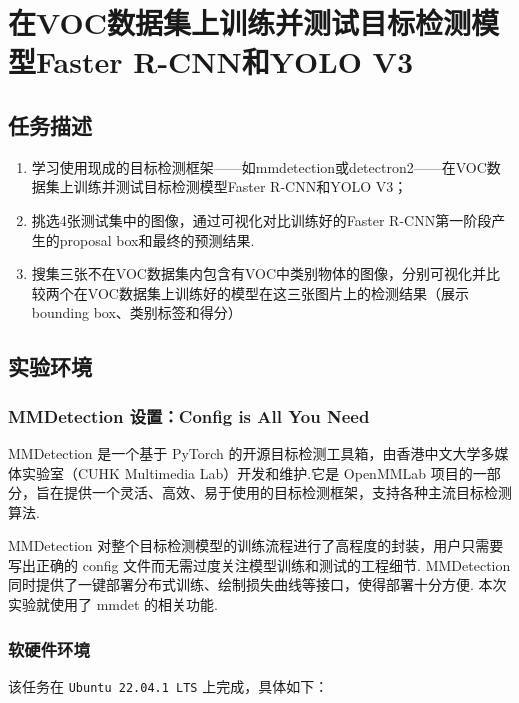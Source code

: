 \documentclass[notitlepage,cs4size,punct,oneside]{ctexrep}
\numberwithin{equation}{chapter}
\theoremstyle{mystyle}
\begin{document}
\chapter{在VOC数据集上训练并测试目标检测模型Faster R-CNN和YOLO V3}
\section{任务描述}
\begin{enumerate}
    \item 学习使用现成的目标检测框架——如mmdetection或detectron2——在VOC数据集上训练并测试目标检测模型Faster R-CNN和YOLO V3；
    \item 挑选4张测试集中的图像，通过可视化对比训练好的Faster R-CNN第一阶段产生的proposal box和最终的预测结果.
    \item 搜集三张不在VOC数据集内包含有VOC中类别物体的图像，分别可视化并比较两个在VOC数据集上训练好的模型在这三张图片上的检测结果（展示bounding box、类别标签和得分）
\end{enumerate}


\section{实验环境}
\subsection{MMDetection 设置：Config is All You Need}
MMDetection 是一个基于 PyTorch 的开源目标检测工具箱，由香港中文大学多媒体实验室（CUHK Multimedia Lab）开发和维护.它是 OpenMMLab 项目的一部分，旨在提供一个灵活、高效、易于使用的目标检测框架，支持各种主流目标检测算法.

MMDetection 对整个目标检测模型的训练流程进行了高程度的封装，用户只需要写出正确的 config 文件而无需过度关注模型训练和测试的工程细节. MMDetection 同时提供了一键部署分布式训练、绘制损失曲线等接口，使得部署十分方便. 本次实验就使用了 mmdet 的相关功能.
\subsection{软硬件环境}

该任务在 \lstinline|Ubuntu 22.04.1 LTS| 上完成，具体如下：
\end{document}
